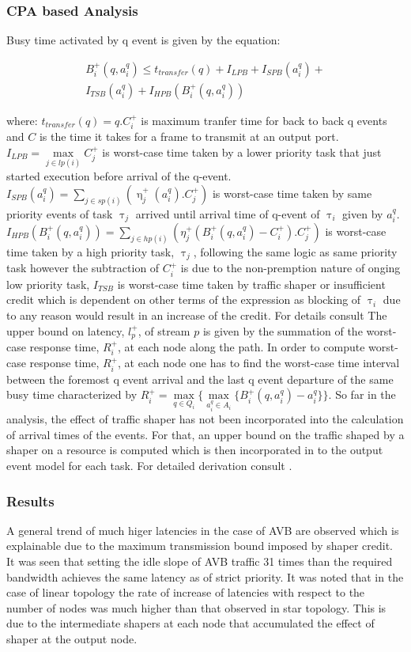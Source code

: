 \documentclass[journal,12pt,twocolumn]{IEEEtran}
\begin{document}
\subsubsection{CPA based Analysis}
Busy time activated by q event is given by the equation:

\begin{align*}
\label{Busytime}
B_i^+(q,a_i^q)\leq t_{transfer}(q)+I_{LPB}+I_{SPB}(a_i^q)+\\
			I_{TSB}(a_i^q)+I_{HPB}(B_i^+(q,a_i^q))
\end{align*}

where: $t_{transfer}(q) = q.C_i^+$ is maximum tranfer time for back to back q events and $C$ is the time it takes for a frame to transmit at an output port. $I_{LPB}=\max\limits_{j\in lp(i)} C_j^+$ is worst-case time taken by a lower priority task that just started execution before arrival of the q-event. $I_{SPB}(a_i^q)=\sum\limits_{j\in sp(i)} (\upeta_j^+(a_i^q).C_j^+)$ is worst-case time taken by same priority events of task $\uptau_j$ arrived until arrival time of q-event of $\uptau_i$ given by $a_i^q$. $I_{HPB}(B_i^+(q,a_i^q))=\sum\limits_{j\in hp(i)} (\eta_j^+(B_i^+(q,a_i^q)-C_i^+).C_j^+)$ is worst-case time taken by a high priority task, $\uptau_j$, following the same logic as same priority task however the subtraction of $C_i^+$ is due to the non-premption nature of onging low priority task, $I_{TSB}$ is worst-case time taken by traffic shaper or insufficient credit which is dependent on other terms of the expression as blocking of $\uptau_i$ due to any reason would result in an increase of the credit. For details consult \cite{CPA}
The upper bound on latency, $l_{p}^+$, of stream $p$ is given by the summation of the worst-case response time, $R_i^+$, at each node along the path. In order to compute worst-case response time, $R_i^+$, at each node one has to find the worst-case time interval between the foremost q event arrival and the last q event departure of the same busy time characterized by $R_i^+=\max\limits_{q\in Q_i}\big\{ \max\limits_{a_i^q\in A_i}\{B_i^+(q,a_i^q)-a_i^q\}\big\}$. 
So far in the analysis, the effect of traffic shaper has not been incorporated into the calculation of arrival times of the events. For that, an upper bound on the traffic shaped by a shaper on a resource is computed which is then incorporated in to the output event model for each task. For detailed derivation consult \cite{CPA}.
\subsubsection {Results}
A general trend of much higer latencies in the case of AVB are observed which is explainable due to the maximum transmission bound imposed by shaper credit. It was seen that setting the idle slope of AVB traffic 31 times than the required bandwidth achieves the same latency as of strict priority. It was noted that in the case of linear topology the rate of increase of latencies with respect to the number of nodes was much higher than that observed in star topology. This is due to the intermediate shapers at each node that accumulated the effect of shaper at the output node.
\end{document}
